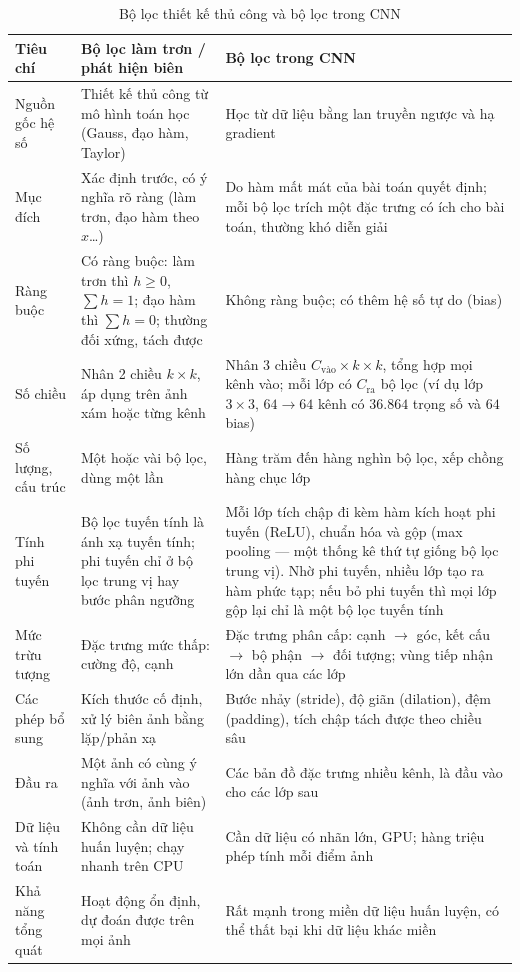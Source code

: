 \begin{table}[ht]
\centering
\scriptsize
\caption{Bộ lọc thiết kế thủ công và bộ lọc trong CNN}
\label{tab:w6_filter_cnn}
\renewcommand{\arraystretch}{1.3}
\begin{tabularx}{\textwidth}{|p{2.2cm}|X|X|}
\hline
\textbf{Tiêu chí} & \textbf{Bộ lọc làm trơn / phát hiện biên} & \textbf{Bộ lọc trong CNN} \\
\hline
Nguồn gốc hệ số & Thiết kế thủ công từ mô hình toán học (Gauss, đạo hàm, Taylor) & Học từ dữ liệu bằng lan truyền ngược và hạ gradient \\
\hline
Mục đích & Xác định trước, có ý nghĩa rõ ràng (làm trơn, đạo hàm theo $x$\ldots) & Do hàm mất mát của bài toán quyết định; mỗi bộ lọc trích một đặc trưng có ích cho bài toán, thường khó diễn giải \\
\hline
Ràng buộc & Có ràng buộc: làm trơn thì $h \ge 0$, $\sum h = 1$; đạo hàm thì $\sum h = 0$; thường đối xứng, tách được & Không ràng buộc; có thêm hệ số tự do (bias) \\
\hline
Số chiều & Nhân 2 chiều $k \times k$, áp dụng trên ảnh xám hoặc từng kênh & Nhân 3 chiều $C_{\text{vào}} \times k \times k$, tổng hợp mọi kênh vào; mỗi lớp có $C_{\text{ra}}$ bộ lọc (ví dụ lớp $3 \times 3$, $64 \to 64$ kênh có $36.864$ trọng số và $64$ bias) \\
\hline
Số lượng, cấu trúc & Một hoặc vài bộ lọc, dùng một lần & Hàng trăm đến hàng nghìn bộ lọc, xếp chồng hàng chục lớp \\
\hline
Tính phi tuyến & Bộ lọc tuyến tính là ánh xạ tuyến tính; phi tuyến chỉ ở bộ lọc trung vị hay bước phân ngưỡng & Mỗi lớp tích chập đi kèm hàm kích hoạt phi tuyến (ReLU), chuẩn hóa và gộp (max pooling — một thống kê thứ tự giống bộ lọc trung vị). Nhờ phi tuyến, nhiều lớp tạo ra hàm phức tạp; nếu bỏ phi tuyến thì mọi lớp gộp lại chỉ là một bộ lọc tuyến tính \\
\hline
Mức trừu tượng & Đặc trưng mức thấp: cường độ, cạnh & Đặc trưng phân cấp: cạnh $\to$ góc, kết cấu $\to$ bộ phận $\to$ đối tượng; vùng tiếp nhận lớn dần qua các lớp \\
\hline
Các phép bổ sung & Kích thước cố định, xử lý biên ảnh bằng lặp/phản xạ & Bước nhảy (stride), độ giãn (dilation), đệm (padding), tích chập tách được theo chiều sâu \\
\hline
Đầu ra & Một ảnh có cùng ý nghĩa với ảnh vào (ảnh trơn, ảnh biên) & Các bản đồ đặc trưng nhiều kênh, là đầu vào cho các lớp sau \\
\hline
Dữ liệu và tính toán & Không cần dữ liệu huấn luyện; chạy nhanh trên CPU & Cần dữ liệu có nhãn lớn, GPU; hàng triệu phép tính mỗi điểm ảnh \\
\hline
Khả năng tổng quát & Hoạt động ổn định, dự đoán được trên mọi ảnh & Rất mạnh trong miền dữ liệu huấn luyện, có thể thất bại khi dữ liệu khác miền \\
\hline
\end{tabularx}
\end{table}

